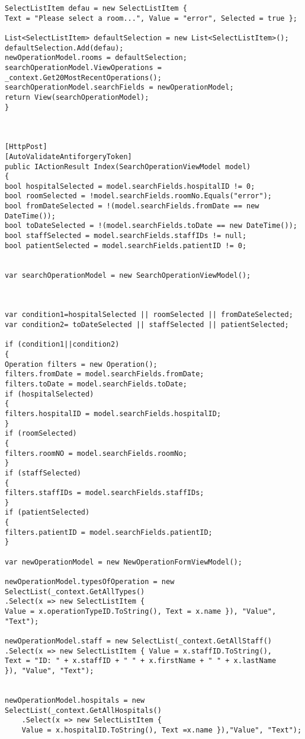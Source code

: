 \begin{lstlisting}
SelectListItem defau = new SelectListItem {
Text = "Please select a room...", Value = "error", Selected = true };

List<SelectListItem> defaultSelection = new List<SelectListItem>();
defaultSelection.Add(defau);
newOperationModel.rooms = defaultSelection;
searchOperationModel.ViewOperations = _context.Get20MostRecentOperations();
searchOperationModel.searchFields = newOperationModel;
return View(searchOperationModel);
}



[HttpPost]
[AutoValidateAntiforgeryToken]
public IActionResult Index(SearchOperationViewModel model)
{
bool hospitalSelected = model.searchFields.hospitalID != 0;
bool roomSelected = !model.searchFields.roomNo.Equals("error");
bool fromDateSelected = !(model.searchFields.fromDate == new DateTime());
bool toDateSelected = !(model.searchFields.toDate == new DateTime());
bool staffSelected = model.searchFields.staffIDs != null;
bool patientSelected = model.searchFields.patientID != 0;


var searchOperationModel = new SearchOperationViewModel();



var condition1=hospitalSelected || roomSelected || fromDateSelected;
var condition2= toDateSelected || staffSelected || patientSelected;

if (condition1||condition2)
{
Operation filters = new Operation();
filters.fromDate = model.searchFields.fromDate;
filters.toDate = model.searchFields.toDate;
if (hospitalSelected)
{
filters.hospitalID = model.searchFields.hospitalID;
}
if (roomSelected)
{
filters.roomNO = model.searchFields.roomNo;
}
if (staffSelected)
{
filters.staffIDs = model.searchFields.staffIDs;
}
if (patientSelected)
{
filters.patientID = model.searchFields.patientID;
}

var newOperationModel = new NewOperationFormViewModel();

newOperationModel.typesOfOperation = new SelectList(_context.GetAllTypes()
.Select(x => new SelectListItem {
Value = x.operationTypeID.ToString(), Text = x.name }), "Value", "Text");

newOperationModel.staff = new SelectList(_context.GetAllStaff()
.Select(x => new SelectListItem { Value = x.staffID.ToString(),
Text = "ID: " + x.staffID + " " + x.firstName + " " + x.lastName
}), "Value", "Text");


newOperationModel.hospitals = new SelectList(_context.GetAllHospitals()
	.Select(x => new SelectListItem {
	Value = x.hospitalID.ToString(), Text =x.name }),"Value", "Text");


\end{lstlisting}
